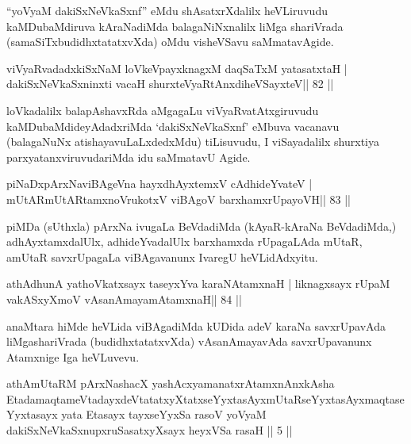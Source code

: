 \begin{artha}
``yoV\s yaM dakiSxNeV\s kaSxnf'' eMdu shAsatxrXdalilx heVLiruvudu kaMDubaMdiruva kAraNadiMda balagaNiNxnalilx liMga shariVrada   (samaSiTxbudidhxtatatxvXda) oMdu visheVSavu saMmatavAgide.
\end{artha}



\begin{shl}
viVyaRvadadxkiSxNaM loVkeV\s payxknagxM daqSaTxM yatasatxtaH |
dakiSxNeV\s kaSxninxti vacaH shurxteVyaRtAnxdiheVSayxteV\hfill || 82 ||
\end{shl}

\begin{artha}
loVkadalilx balapAshavxRda aMgagaLu viVyaRvatAtxgiruvudu kaMDubaMdideyAdadxriMda `dakiSxNeV\s kaSxnf' eMbuva vacanavu (balagaNuNx atishayavuLaLxdedxMdu) tiLisuvudu, I viSayadalilx shurxtiya parxyatanxviruvudariMda idu saMmatavU Agide.
\end{artha}



\begin{shl}
piNaDxpArxNaviBAgeVna hayxdhAyxtemxV cAdhideYvateV |
mUtARmUtARtamxnoVrukotxV viBAgoV barxhamxrUpayoVH\hfill || 83 ||
\end{shl}

\begin{artha}
piMDa (sUthxla) pArxNa ivugaLa BeVdadiMda (kAyaR-kAraNa BeVdadiMda,) adhAyxtamxdalUlx, adhideYvadalUlx barxhamxda rUpagaLAda mUtaR, amUtaR savxrUpagaLa viBAgavanunx IvaregU heVLidAdxyitu.
\end{artha}

\begin{shl}
athAdhunA yathoVkatxsayx taseyxYva karaNAtamxnaH |
liknagxsayx rUpaM vakASxyXmoV vAsanAmayamAtamxnaH\hfill || 84 ||
\end{shl}

\begin{artha}
anaMtara hiMde heVLida viBAgadiMda kUDida adeV karaNa savxrUpavAda
liMgashariVrada (budidhxtatatxvXda) vAsanAmayavAda savxrUpavanunx
Atamxnige Iga heVLuvevu.
\end{artha}


\begin{kandikeshl}
athAmUtaRM pArxNashacX yashAcxyamanatxrAtamxnAnxkAsha EtadamaqtameVtadayxdeVtatatxyXtatxseYyxtasAyxmUtaRseYyxtasAyxmaqtaseYyxtasayx yata Etasayx tayxseYyxSa rasoV yoV\s yaM dakiSxNeV\s kaSxnupxruSasatxyXsayx heyxVSa rasaH || 5 ||
\end{kandikeshl}

